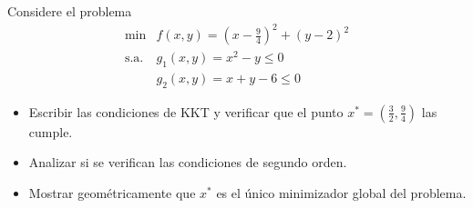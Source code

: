 \documentclass{article}
\newenvironment{theorem}[2][Ejercicio]{\begin{trivlist}
\item[\hskip \labelsep {\bfseries #1}\hskip \labelsep {\bfseries #2.}]}{\end{trivlist}}
\begin{document}
\begin{theorem}{10}
    Considere el problema
    \[
        \begin{array}{ll}
            \min        & f(x, y) = {(x - \frac{9}{4})}^2 + {(y- 2)}^2 \\
            \text{s.a.} & g_1(x, y) = x^2 - y \leq 0                   \\
                        & g_2(x, y) = x + y - 6 \leq 0
        \end{array}
    \]
    \begin{itemize}
        \item[(a)] Escribir las condiciones de KKT y verificar que el punto \( x^* = (\frac{3}{2}, \frac{9}{4}) \) las cumple.
        \item[(b)] Analizar si se verifican las condiciones de segundo orden.
        \item[(c)] Mostrar geométricamente que \( x^* \) es el único minimizador global del problema.
    \end{itemize}
\end{theorem}
\end{document}
